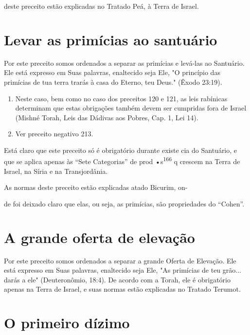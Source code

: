 deste preceito estão explicadas no Tratado Peá, à Terra de Israel.

\section{Levar as primícias ao santuário}


Por este preceito somos ordenados a separar as primícias e levá-las ao
Santuário. Ele está expresso em Suas palavras, enaltecido seja Ele, "O
princí­pio das primícias de tua terra trarás à casa do Eterno, teu
Deus." (Êxodo 23:19).


\begin{enumerate}
\def\labelenumi{\arabic{enumi}.}
\setcounter{enumi}{163}
\item
 
 Neste caso, bem como no caso dos preceitos 120 e 121, as leis
 rabínicas determinam que estas obrigações também devem ser cumpridas
 fora de Israel (Mishné Torah, Leis das Dádivas aos Po­bres, Cap. 1,
 Lei 14).
 
\item
 
 Ver preceito negativo 213.
 
\end{enumerate}




Está claro que este preceito só é obrigatório durante existe cia do
Santuário, e que se aplica apenas às ``Sete Categorias'' de prod
•s\textsuperscript{166} q crescem na Ter­ra de Israel, na Síria e na
Transjordânia.

As normas deste preceito estão explicadas atado Bicurim, on-


de foi deixado claro que elas, ou seja, as primícias, são propriedades
do ``Cohen''.


\section{A grande oferta de elevação}

Por este preceito somos ordenados a separar a grande Oferta de
Ele­vação. Ele está expresso em Suas palavras, enaltecido seja Ele, "As
primícias de teu grão... darás a ele" (Deuteronômio, 18:4). De acordo
com a Torah, ele é obrigatório apenas na Terra de Israel, e suas normas
estão explicadas no Tra­tado Terumot.

\section{O primeiro dízimo}


